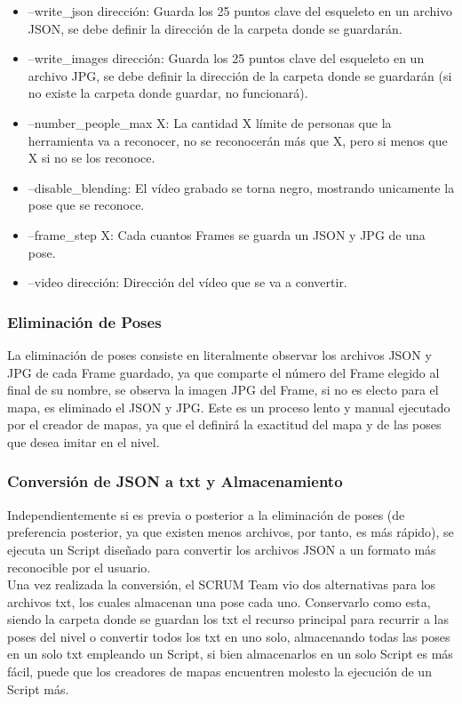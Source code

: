 \begin{itemize}
	\item --write\_json dirección: Guarda los 25 puntos clave del esqueleto en un archivo JSON, se debe definir la dirección de la carpeta donde se guardarán.
	\item --write\_images dirección: Guarda los 25 puntos clave del esqueleto en un archivo JPG, se debe definir la dirección de la carpeta donde se guardarán (si no existe la carpeta donde guardar, no funcionará).
	\item --number\_people\_max X: La cantidad X límite de personas que la herramienta va a reconocer, no se reconocerán más que X, pero si menos que X si no se los reconoce.
	\item --disable\_blending: El vídeo grabado se torna negro, mostrando unicamente la pose que se reconoce.
	\item --frame\_step X: Cada cuantos Frames se guarda un JSON y JPG de una pose.
	\item --video dirección: Dirección del vídeo que se va a convertir.
\end{itemize}

\subsubsection{Eliminación de Poses}

La eliminación de poses consiste en literalmente observar los archivos JSON y JPG de cada Frame guardado, ya que comparte el número del Frame elegido al final de su nombre, se observa la imagen JPG del Frame, si no es electo para el mapa, es eliminado el JSON y JPG. Este es un proceso lento y manual ejecutado por el creador de mapas, ya que el definirá la exactitud del mapa y de las poses que desea imitar en el nivel.

\subsubsection{Conversión de JSON a txt y Almacenamiento}

Independientemente si es previa o posterior a la eliminación de poses (de preferencia posterior, ya que existen menos archivos, por tanto, es más rápido), se ejecuta un Script diseñado para convertir los archivos JSON a un formato más reconocible por el usuario. 
\\
Una vez realizada la conversión, el SCRUM Team vio dos alternativas para los archivos txt, los cuales almacenan una pose cada uno. Conservarlo como esta, siendo la carpeta donde se guardan los txt el recurso principal para recurrir a las poses del nivel o convertir todos los txt en uno solo, almacenando todas las poses en un solo txt empleando un Script, si bien almacenarlos en un solo Script es más fácil, puede que los creadores de mapas encuentren molesto la ejecución de un Script más.

